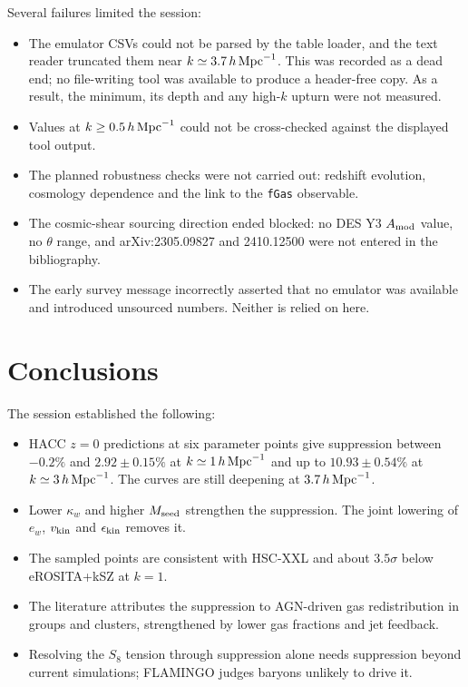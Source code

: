 \documentclass[11pt,a4paper]{article}
\begin{document}
Several failures limited the session:
\begin{itemize}
\item The emulator CSVs could not be parsed by the table loader, and the text reader truncated them near $k\simeq3.7\,h\,{\rm Mpc}^{-1}$. This was recorded as a dead end; no file-writing tool was available to produce a header-free copy. As a result, the minimum, its depth and any high-$k$ upturn were not measured.
\item Values at $k\geq0.5\,h\,{\rm Mpc}^{-1}$ could not be cross-checked against the displayed tool output.
\item The planned robustness checks were not carried out: redshift evolution, cosmology dependence and the link to the \texttt{fGas} observable.
\item The cosmic-shear sourcing direction ended blocked: no DES Y3 $A_{\rm mod}$ value, no $\theta$ range, and arXiv:2305.09827 and 2410.12500 were not entered in the bibliography.
\item The early survey message incorrectly asserted that no emulator was available and introduced unsourced numbers. Neither is relied on here.
\end{itemize}

\section{Conclusions}

The session established the following:
\begin{itemize}
\item HACC $z=0$ predictions at six parameter points give suppression between $-0.2\%$ and $2.92\pm0.15\%$ at $k\simeq1\,h\,{\rm Mpc}^{-1}$ and up to $10.93\pm0.54\%$ at $k\simeq3\,h\,{\rm Mpc}^{-1}$. The curves are still deepening at $3.7\,h\,{\rm Mpc}^{-1}$.
\item Lower $\kappa_w$ and higher $M_{\rm seed}$ strengthen the suppression. The joint lowering of $e_w$, $v_{\rm kin}$ and $\epsilon_{\rm kin}$ removes it.
\item The sampled points are consistent with HSC-XXL and about $3.5\sigma$ below eROSITA+kSZ at $k=1$.
\item The literature attributes the suppression to AGN-driven gas redistribution in groups and clusters, strengthened by lower gas fractions and jet feedback.
\item Resolving the $S_8$ tension through suppression alone needs suppression beyond current simulations; FLAMINGO judges baryons unlikely to drive it.
\end{itemize}
\end{document}
